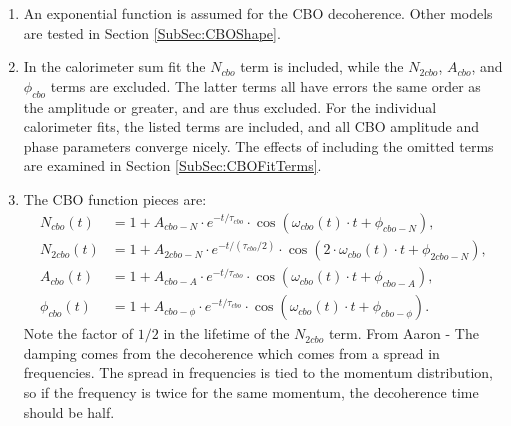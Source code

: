 \begin{enumerate}
		\item{An exponential function is assumed for the CBO decoherence. Other models are tested in Section \ref{SubSec:CBOShape}.}
		\item{In the calorimeter sum fit the $N_{cbo}$ term is included, while the $N_{2cbo}$, $A_{cbo}$, and $\phi_{cbo}$ terms are excluded. The latter terms all have errors the same order as the amplitude or greater, and are thus excluded. For the individual calorimeter fits, the listed terms are included, and all CBO amplitude and phase parameters converge nicely. The effects of including the omitted terms are examined in Section \ref{SubSec:CBOFitTerms}.}
		\item{The CBO function pieces are:
			\begin{equation}
			\begin{aligned}
					N_{cbo}(t) &= 1 + A_{cbo-N} \cdot e^{-t/\tau_{cbo}} \cdot \cos(\omega_{cbo}(t) \cdot t + \phi_{cbo-N}), \\
					N_{2cbo}(t) &= 1 + A_{2cbo-N} \cdot e^{-t/(\tau_{cbo}/2)} \cdot \cos(2 \cdot \omega_{cbo}(t) \cdot t + \phi_{2cbo-N}), \\
					A_{cbo}(t) &= 1 + A_{cbo-A} \cdot e^{-t/\tau_{cbo}} \cdot \cos(\omega_{cbo}(t) \cdot t + \phi_{cbo-A}), \\
					\phi_{cbo}(t) &= 1 + A_{cbo-\phi} \cdot e^{-t/\tau_{cbo}} \cdot \cos(\omega_{cbo}(t) \cdot t + \phi_{cbo-\phi}).
			\label{eqn:CBO}
			\end{aligned}
			\end{equation}
		Note the factor of $1/2$ in the lifetime of the $N_{2cbo}$ term. From Aaron - The damping comes from the decoherence which comes from a spread in frequencies. The spread in frequencies is tied to the momentum distribution, so if the frequency is twice for the same momentum, the decoherence time should be half.
		}
	\end{enumerate}

